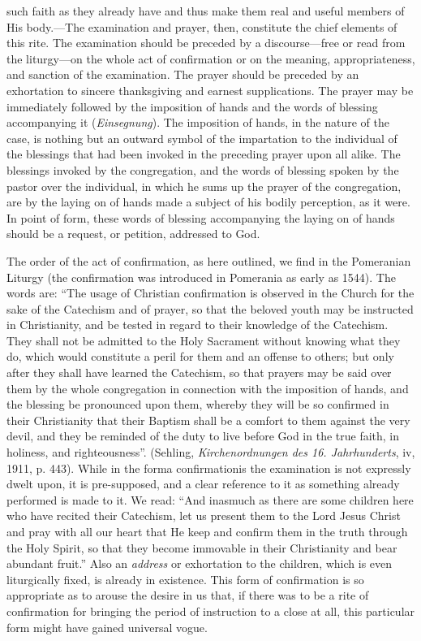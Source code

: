 such faith as they already have and thus make them real and useful members of His body.—The examination and prayer, then, constitute the chief elements of this rite. The examination should be preceded by a discourse—free or read from the liturgy—on the whole act of confirmation or on the meaning, appropriateness, and sanction of the examination. The prayer should be preceded by an exhortation to sincere thanksgiving and earnest supplications. The prayer may be immediately followed by the imposition of hands and the words of blessing accompanying it (\emph{Einsegnung}). The imposition of hands, in the nature of the case, is nothing but an outward symbol of the impartation to the individual of the blessings that had been invoked in the preceding prayer upon all alike. The blessings invoked by the congregation, and the words of blessing spoken by the pastor over the individual, in which he sums up the prayer of the congregation, are by the laying on of hands made a subject of his bodily perception, as it were. In point of form, these words of blessing accompanying the laying on of hands should be a request, or petition, addressed to God.

The order of the act of confirmation, as here outlined, we find in the Pomeranian Liturgy (the confirmation was introduced in Pomerania as early as 1544). The words are: “The usage of Christian confirmation is observed in the Church for the sake of the Catechism and of prayer, so that the beloved youth may be instructed in Christianity, and be tested in regard to their knowledge of the Catechism. They shall not be admitted to the Holy Sacrament without knowing what they do, which would constitute a peril for them and an offense to others; but only after they shall have learned the Catechism, so that prayers may be said over them by the whole congregation in connection with the imposition of hands, and the blessing be pronounced upon them, whereby they will be so confirmed in their Christianity that their Baptism shall be a comfort to them against the very devil, and they be reminded
of the duty to live before God in the true faith, in holiness, and righteousness”. (Sehling, \emph{Kirchenordnungen des 16. Jahrhunderts}, iv, 1911, p. 443). While in the forma confirmationis the examination is not expressly dwelt upon, it is pre-supposed, and a clear reference to it as something already performed is made to it. We read: “And inasmuch as there are some children here who have recited their Catechism, let us present them to the Lord Jesus Christ and pray with all our heart that He keep and confirm them in the truth through the Holy Spirit, so that they become immovable in their Christianity and bear abundant fruit.” Also an \emph{address} or exhortation to the children, which is even liturgically fixed, is already in existence. This form of confirmation is so appropriate as to arouse the desire in us that, if there was to be a rite of confirmation for bringing the period of instruction to a close at all, this particular form might have gained universal vogue.

